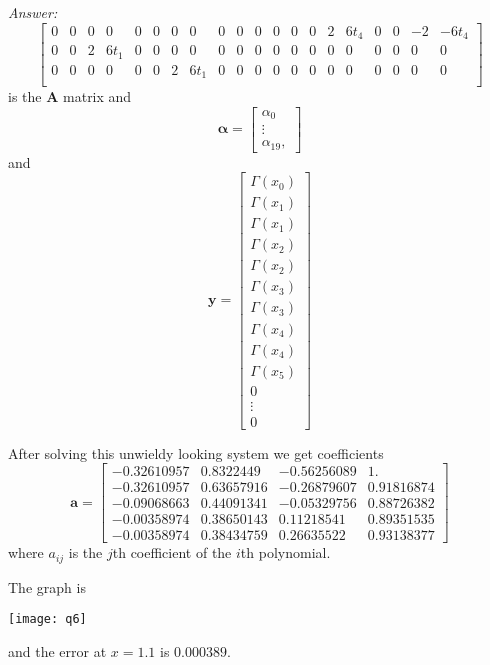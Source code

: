 \documentclass{article}
\newenvironment{answer}{\textit{Answer:}}{}
\begin{document}
\begin{answer}
\begin{equation*}
\begin{bmatrix}
            0 & 0   & 0     & 0      & 0 & 0   & 0     & 0       & 0 & 0   & 0     & 0       & 0 & 0   & 2     & 6t_4    & 0 & 0   & -2    & -6t_4   \\
            0 & 0   & 2     & 6t_1   & 0 & 0   & 0     & 0       & 0 & 0   & 0     & 0       & 0 & 0   & 0     & 0       & 0 & 0   & 0     & 0       \\
            0 & 0   & 0     & 0      & 0 & 0   & 2     & 6t_1    & 0 & 0   & 0     & 0       & 0 & 0   & 0     & 0       & 0 & 0   & 0     & 0       \\
        \end{bmatrix}
    \end{equation*}
    is the $\bm{A}$ matrix and
    \begin{equation*}
        \bm{\alpha} = \begin{bmatrix}
            \alpha_0 \\ \vdots \\ \alpha_{19},
        \end{bmatrix}
    \end{equation*}
    and
    \begin{equation*}
        \bm{y} = \begin{bmatrix}
            \Gamma(x_0) \\ \Gamma(x_1)\\\Gamma(x_1)\\\Gamma(x_2)\\ \Gamma(x_2)\\
            \Gamma(x_3) \\ \Gamma(x_3)\\ \Gamma(x_4)\\ \Gamma(x_4)\\ \Gamma(x_5)\\
            0           \\ \vdots \\ 0
        \end{bmatrix}
    \end{equation*}

    After solving this unwieldy looking system we get coefficients
    \begin{equation*}
        \bm{a} = \begin{bmatrix}
            -0.32610957 & 0.8322449  & -0.56256089 & 1.         \\
            -0.32610957 & 0.63657916 & -0.26879607 & 0.91816874 \\
            -0.09068663 & 0.44091341 & -0.05329756 & 0.88726382 \\
            -0.00358974 & 0.38650143 & 0.11218541  & 0.89351535 \\
            -0.00358974 & 0.38434759 & 0.26635522  & 0.93138377
        \end{bmatrix}
    \end{equation*}
    where $a_{ij}$ is the $j$th coefficient of the $i$th polynomial.

    The graph is

    \texttt{[image: q6]}

    and the error at $x = 1.1$ is $0.000389$.

\end{answer}
\end{document}
